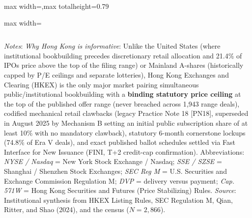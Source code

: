 \documentclass[11pt,letterpaper]{article}
\begin{document}
\begin{table}[!htbp]
\begin{adjustbox}{max width=\textwidth,max totalheight=0.79\textheight}
\begin{minipage}{\textwidth}
\begin{adjustbox}{max width=\textwidth}
\begin{tabular}{>{\raggedright\arraybackslash}p{2.90cm}>{\raggedright\arraybackslash}p{4.30cm}>{\raggedright\arraybackslash}p{4.30cm}>{\raggedright\arraybackslash}p{4.30cm}}
\bottomrule
\end{tabular}
\end{adjustbox}
\end{minipage}
\end{adjustbox}
\par\vspace{3pt}\noindent\parbox{\textwidth}{\scriptsize\raggedright \textit{Notes}: \textit{Why Hong Kong is informative}: Unlike the United States (where institutional bookbuilding precedes discretionary retail allocation and 21.4\% of IPOs price above the top of the filing range) or Mainland A-shares (historically capped by P/E ceilings and separate lotteries), Hong Kong Exchanges and Clearing (HKEX) is the only major market pairing simultaneous public/institutional bookbuilding with a \textbf{binding statutory price ceiling} at the top of the published offer range (never breached across 1,943 range deals), codified mechanical retail clawbacks (legacy Practice Note 18 [PN18], superseded in August 2025 by Mechanism B setting an initial public subscription share of at least 10\% with no mandatory clawback), statutory 6-month cornerstone lockups (74.8\% of Era V deals), and exact published ballot schedules settled via Fast Interface for New Issuance (FINI, T+2 credit-cap confirmation). Abbreviations: \textit{NYSE / Nasdaq} = New York Stock Exchange / Nasdaq; \textit{SSE / SZSE} = Shanghai / Shenzhen Stock Exchanges; \textit{SEC Reg M} = U.S. Securities and Exchange Commission Regulation M; \textit{DVP} = delivery versus payment; \textit{Cap. 571W} = Hong Kong Securities and Futures (Price Stabilizing) Rules. \textit{Source}: Institutional synthesis from HKEX Listing Rules, SEC Regulation M, Qian, Ritter, and Shao (2024), and the census ($N = 2,866$).}
\end{table}
\end{document}
